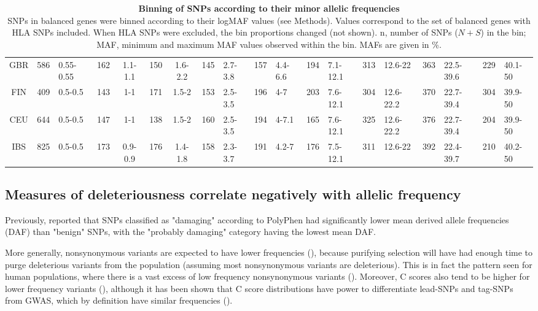 \begin{refsection}
\begin{otherlanguage}{english}
\begin{table}
\begin{tabular}{@{}ccllclcllllllllllll@{}}
GBR & 586 & 0.55-0.55 & 162 & 1.1-1.1 & 150 & 1.6-2.2 & 145 & 2.7-3.8 & 157 & 4.4-6.6 & 194 & 7.1-12.1 & 313 & 12.6-22 & 363 & 22.5-39.6 & 229 & 40.1-50 \\
FIN & 409 & 0.5-0.5 & 143 & 1-1 & 171 & 1.5-2 & 153 & 2.5-3.5 & 196 & 4-7 & 203 & 7.6-12.1 & 304 & 12.6-22.2 & 370 & 22.7-39.4 & 304 & 39.9-50 \\
CEU & 644 & 0.5-0.5 & 147 & 1-1 & 138 & 1.5-2 & 160 & 2.5-3.5 & 194 & 4-7.1 & 165 & 7.6-12.1 & 325 & 12.6-22.2 & 376 & 22.7-39.4 & 204 & 39.9-50 \\
IBS & 825 & 0.5-0.5 & 173 & 0.9-0.9 & 176 & 1.4-1.8 & 158 & 2.3-3.7 & 191 & 4.2-7 & 176 & 7.5-12.1 & 311 & 12.6-22 & 392 & 22.4-39.7 & 210 & 40.2-50  \\ \bottomrule
\end{tabular}
\caption{\textbf{Binning of SNPs according to their minor allelic frequencies}\\ SNPs in balanced genes were binned according to their logMAF values (see Methods). Values  correspond to the set of balanced genes with HLA SNPs included. When HLA SNPs were excluded, the bin proportions changed (not shown). n, number of SNPs ($N+S$) in the bin; MAF, minimum and maximum MAF values observed within the bin. MAFs are given in \%.}
\label{tab:logMAF_bins}
\end{table}

\afterpage{\FloatBarrier}
\subsection{Measures of deleteriousness correlate negatively with allelic frequency}

Previously, \textcite{Lohmueller2008} reported that SNPs classified as "damaging" according to PolyPhen had significantly lower mean derived allele frequencies (DAF) than "benign" SNPs, with the "probably damaging" category having the lowest mean DAF.

More generally, nonsynonymous variants are expected to have lower frequencies (\cite{Brandvain2016}), because purifying selection will have had enough time to purge deleterious variants from the population (assuming most nonsynonymous variants are deleterious). This is in fact the pattern seen for human populations, where there is a vast excess of low frequency nonsynonymous variants (\cite{Casals2013,Fu2012,Tennessen2012}). Moreover, C scores also tend to be higher for lower frequency variants (\cite{Kircher2014}), although it has been shown that C score distributions have power to differentiate lead-SNPs and tag-SNPs from GWAS, which by definition have similar frequencies (\cite{Kircher2014}).



\end{otherlanguage}
\end{refsection}
